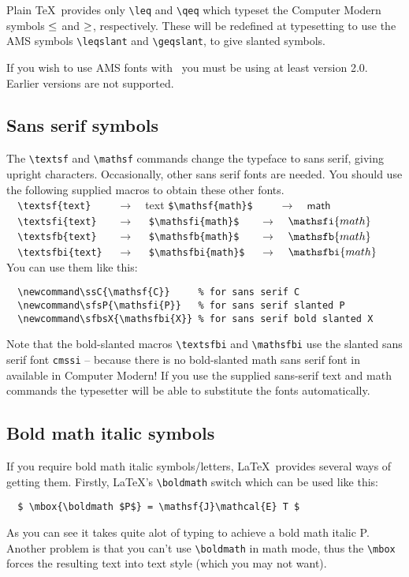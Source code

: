 \documentclass{fac}
\newcommand\lra{\ensuremath{\quad\longrightarrow\quad}}
\begin{document}
Plain \TeX\ provides only \verb"\leq" and \verb"\qeq" which typeset the
Computer Modern symbols $\leq$ and $\geq$, respectively. These will
be redefined at typesetting to use the AMS symbols \verb"\leqslant" and
\verb"\geqslant", to give slanted symbols.

If you wish to use AMS fonts with \LaTeXe\ you must be using at least
version 2.0. Earlier versions are not supported.

\subsection{Sans serif symbols}

The \verb"\textsf" and \verb"\mathsf" commands change the typeface to
sans serif, giving upright characters. Occasionally, other sans serif
fonts are needed. You should use the following supplied macros to obtain
these other fonts.\\[6pt]
%
\verb"  \textsf{text}  " \lra \textsf{text}
  \qquad \verb"$\mathsf{math}$  " \lra $\mathsf{math}$\\
\verb"  \textsfi{text} " \lra {}
  \qquad \verb"$\mathsfi{math}$ " \lra $\mathsfi{math}$\\
\verb"  \textsfb{text} " \lra {}
  \qquad \verb"$\mathsfb{math}$ " \lra $\mathsfb{math}$\\
\verb"  \textsfbi{text}" \lra {}
  \qquad \verb"$\mathsfbi{math}$" \lra $\mathsfbi{math}$\\[6pt]
%
You can use them like this:
%
\begin{verbatim}
  \newcommand\ssC{\mathsf{C}}     % for sans serif C
  \newcommand\sfsP{\mathsfi{P}}   % for sans serif slanted P
  \newcommand\sfbsX{\mathsfbi{X}} % for sans serif bold slanted X
\end{verbatim}
%
Note that the bold-slanted macros \verb"\textsfbi" and
\verb"\mathsfbi" use the slanted sans serif font \verb"cmssi"
-- because there is no bold-slanted math sans serif font in available in
Computer Modern!  If you use the supplied sans-serif text and math commands
the typesetter will be able to substitute the fonts automatically.

\subsection{Bold math italic symbols}

If you require bold math italic symbols/letters, \LaTeX\ provides several ways
of getting them.  Firstly, \LaTeX's \verb"\boldmath" switch which can be
used like this:
\begin{verbatim}
  $ \mbox{\boldmath $P$} = \mathsf{J}\mathcal{E} T $
\end{verbatim}
As you can see it takes quite alot of typing to achieve a bold math italic P.
Another problem is that you can't use \verb"\boldmath" in math mode, thus the
\verb"\mbox" forces the resulting text into text style (which you may not
want).
\end{document}
